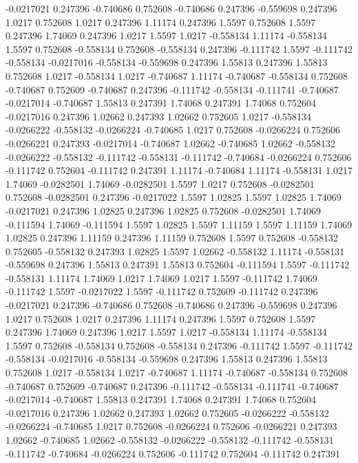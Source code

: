 -0.0217021 0.247396
-0.740686 0.752608
-0.740686 0.247396
-0.559698 0.247396
1.0217 0.752608
1.0217 0.247396
1.11174 0.247396
1.5597 0.752608
1.5597 0.247396
1.74069 0.247396
1.0217 1.5597
1.0217 -0.558134
1.11174 -0.558134
1.5597 0.752608
-0.558134 0.752608
-0.558134 0.247396
-0.111742 1.5597
-0.111742 -0.558134
-0.0217016 -0.558134
-0.559698 0.247396
1.55813 0.247396
1.55813 0.752608
1.0217 -0.558134
1.0217 -0.740687
1.11174 -0.740687
-0.558134 0.752608
-0.740687 0.752609
-0.740687 0.247396
-0.111742 -0.558134
-0.111741 -0.740687
-0.0217014 -0.740687
1.55813 0.247391
1.74068 0.247391
1.74068 0.752604
-0.0217016 0.247396
1.02662 0.247393
1.02662 0.752605
1.0217 -0.558134
-0.0266222 -0.558132
-0.0266224 -0.740685
1.0217 0.752608
-0.0266224 0.752606
-0.0266221 0.247393
-0.0217014 -0.740687
1.02662 -0.740685
1.02662 -0.558132
-0.0266222 -0.558132
-0.111742 -0.558131
-0.111742 -0.740684
-0.0266224 0.752606
-0.111742 0.752604
-0.111742 0.247391
1.11174 -0.740684
1.11174 -0.558131
1.0217 1.74069
-0.0282501 1.74069
-0.0282501 1.5597
1.0217 0.752608
-0.0282501 0.752608
-0.0282501 0.247396
-0.0217022 1.5597
1.02825 1.5597
1.02825 1.74069
-0.0217021 0.247396
1.02825 0.247396
1.02825 0.752608
-0.0282501 1.74069
-0.111594 1.74069
-0.111594 1.5597
1.02825 1.5597
1.11159 1.5597
1.11159 1.74069
1.02825 0.247396
1.11159 0.247396
1.11159 0.752608
1.5597 0.752608
-0.558132 0.752605
-0.558132 0.247393
1.02825 1.5597
1.02662 -0.558132
1.11174 -0.558131
-0.559698 0.247396
1.55813 0.247391
1.55813 0.752604
-0.111594 1.5597
-0.111742 -0.558131
1.11174 1.74069
1.0217 1.74069
1.0217 1.5597
-0.111742 1.74069
-0.111742 1.5597
-0.0217022 1.5597
-0.111742 0.752609
-0.111742 0.247396
-0.0217021 0.247396
-0.740686 0.752608
-0.740686 0.247396
-0.559698 0.247396
1.0217 0.752608
1.0217 0.247396
1.11174 0.247396
1.5597 0.752608
1.5597 0.247396
1.74069 0.247396
1.0217 1.5597
1.0217 -0.558134
1.11174 -0.558134
1.5597 0.752608
-0.558134 0.752608
-0.558134 0.247396
-0.111742 1.5597
-0.111742 -0.558134
-0.0217016 -0.558134
-0.559698 0.247396
1.55813 0.247396
1.55813 0.752608
1.0217 -0.558134
1.0217 -0.740687
1.11174 -0.740687
-0.558134 0.752608
-0.740687 0.752609
-0.740687 0.247396
-0.111742 -0.558134
-0.111741 -0.740687
-0.0217014 -0.740687
1.55813 0.247391
1.74068 0.247391
1.74068 0.752604
-0.0217016 0.247396
1.02662 0.247393
1.02662 0.752605
-0.0266222 -0.558132
-0.0266224 -0.740685
1.0217 0.752608
-0.0266224 0.752606
-0.0266221 0.247393
1.02662 -0.740685
1.02662 -0.558132
-0.0266222 -0.558132
-0.111742 -0.558131
-0.111742 -0.740684
-0.0266224 0.752606
-0.111742 0.752604
-0.111742 0.247391
